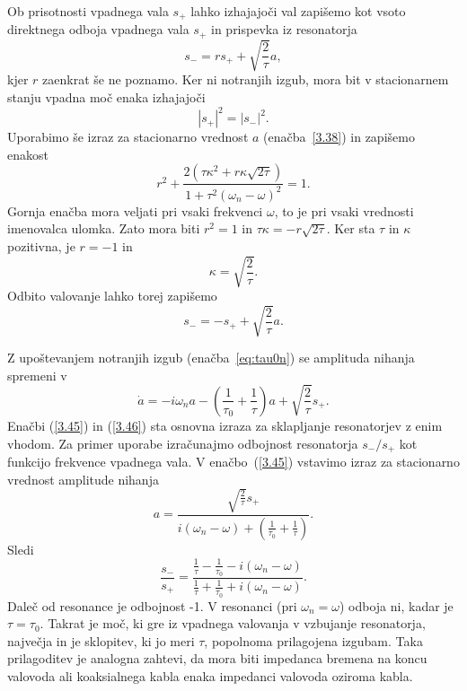 Ob prisotnosti vpadnega vala $s_{+}$ lahko izhajajoči val zapišemo kot
vsoto direktnega odboja vpadnega vala $s_{+}$ in prispevka iz resonatorja
\begin{equation}
s_{-}=rs_{+}+\sqrt{\frac{2}{\tau}}a,
\label{3.41}
\end{equation}
kjer $r$ zaenkrat še ne poznamo. Ker ni notranjih izgub, mora bit v 
stacionarnem stanju vpadna moč enaka izhajajoči
\begin{equation}
|s_{+}|^{2}=|s_{-}|^{2}.
\label{3.42}
\end{equation}
Uporabimo še izraz za stacionarno vrednost $a$  (enačba~\ref{3.38}) in zapišemo
enakost 
\begin{equation}
r^{2}+\frac{2(\tau\kappa^{2}+r\kappa\sqrt{2\tau})}{1+\tau^{2}(\omega_{n}-\omega)^{2}}=1.
\label{3.43}
\end{equation}
Gornja enačba mora veljati pri vsaki frekvenci $\omega$, to je pri vsaki vrednosti imenovalca
ulomka. Zato mora biti $r^{2}=1$ in $\tau\kappa=-r\sqrt{2\tau}$.
Ker sta $\tau$ in $\kappa$ pozitivna, je $r=-1$ in 
\begin{equation}
\kappa=\sqrt{\frac{2}{\tau}}.
\label{3.44}
\end{equation}
 Odbito valovanje lahko torej zapišemo 
\begin{equation}
s_{-}=-s_{+}+\sqrt{\frac{2}{\tau}}a.
\label{3.45}
\end{equation}

Z upoštevanjem notranjih izgub (enačba~\ref{eq:tau0n}) se amplituda nihanja spremeni v 
\begin{equation}
\dot{a}=-i\omega_{n}a-\left(\frac{1}{\tau_{0}}+\frac{1}{\tau}\right)a+
\sqrt{\frac{2}{\tau}}s_{+}.
\label{3.46}
\end{equation}
 Enačbi (\ref{3.45}) in (\ref{3.46}) sta osnovna izraza za sklapljanje
resonatorjev z enim vhodom. Za primer uporabe izračunajmo odbojnost
resonatorja $s_{-}/s_{+}$ kot funkcijo frekvence vpadnega vala. V
enačbo~(\ref{3.45}) vstavimo izraz za stacionarno vrednost amplitude
nihanja 
\begin{equation}
a=\frac{\sqrt{\frac{2}{\tau}}s_{+}}{i(\omega_{n}-\omega)+(\frac{1}{\tau_{0}}+
\frac{1}{\tau})}.
\label{3.47}
\end{equation}
Sledi
\begin{equation}
\frac{s_{-}}{s_{+}}=\frac{\frac{1}{\tau}-\frac{1}{\tau_0}-i(\omega_{n}-\omega)}
{\frac{1}{\tau}
+\frac{1}{\tau_0}+i(\omega_{n}-\omega)}.
\label{3.48}
\end{equation}
Daleč od resonance je odbojnost -1. V resonanci (pri $\omega_{n}=\omega$)
odboja ni, kadar je $\tau=\tau_{0}$. Takrat je moč, ki gre iz
vpadnega valovanja v vzbujanje resonatorja, največja in je sklopitev,
ki jo meri $\tau$, popolnoma prilagojena izgubam. Taka prilagoditev
je analogna zahtevi, da mora biti impedanca bremena na koncu valovoda
ali koaksialnega kabla enaka impedanci valovoda oziroma kabla.

